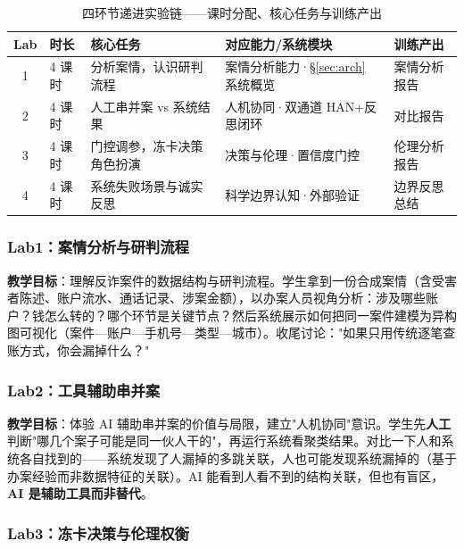\documentclass[12pt,a4paper]{ctexart}
\begin{document}
\begin{table}[H]
  \centering
  \caption{四环节递进实验链——课时分配、核心任务与训练产出}
  \label{tab:stages}
  \begin{tabular}{cp{1.4cm}p{3.0cm}p{3.2cm}p{2.4cm}}
    \toprule
    Lab & 时长 & 核心任务 & 对应能力/系统模块 & 训练产出 \\
    \midrule
    1 & 4 课时 & 分析案情，认识研判流程 & 案情分析能力·\S\ref{sec:arch} 系统概览 & 案情分析报告 \\
    2 & 4 课时 & 人工串并案 vs 系统结果 & 人机协同·双通道 HAN+反思闭环 & 对比报告 \\
    3 & 4 课时 & 门控调参，冻卡决策角色扮演 & 决策与伦理·置信度门控 & 伦理分析报告 \\
    4 & 4 课时 & 系统失败场景与诚实反思 & 科学边界认知·外部验证 & 边界反思总结 \\
    \bottomrule
  \end{tabular}
  \par\vspace{1.5\baselineskip}
\end{table}

\subsubsection{Lab1：案情分析与研判流程}

\textbf{教学目标}：理解反诈案件的数据结构与研判流程。学生拿到一份合成案情（含受害者陈述、账户流水、通话记录、涉案金额），以办案人员视角分析：涉及哪些账户？钱怎么转的？哪个环节是关键节点？然后系统展示如何把同一案件建模为异构图可视化（案件—账户—手机号—类型—城市）。收尾讨论："如果只用传统逐笔查账方式，你会漏掉什么？"

\subsubsection{Lab2：工具辅助串并案}

\textbf{教学目标}：体验 AI 辅助串并案的价值与局限，建立"人机协同"意识。学生先\textbf{人工}判断"哪几个案子可能是同一伙人干的"，再运行系统看聚类结果。对比一下人和系统各自找到的——系统发现了人漏掉的多跳关联，人也可能发现系统漏掉的（基于办案经验而非数据特征的关联）。AI 能看到人看不到的结构关联，但也有盲区，\textbf{AI 是辅助工具而非替代}。

\subsubsection{Lab3：冻卡决策与伦理权衡}
\end{document}

